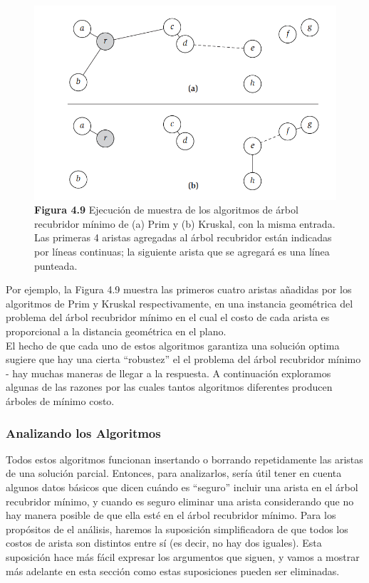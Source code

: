 \documentclass[a4paper, 12pt]{book}
\theoremstyle{dotless}
\begin{document}
\begin{figure}[h]
\centering
\includegraphics[scale=0.7]{Imagenes-Seccion4/fig_4_9.PNG}
\textbf{Figura 4.9} Ejecución de muestra de los algoritmos de árbol recubridor mínimo de (a) Prim y (b) Kruskal, con la misma entrada. Las primeras 4 aristas agregadas al árbol recubridor están indicadas por líneas continuas; la siguiente arista que se agregará es una línea punteada.
\end{figure}


Por ejemplo, la Figura 4.9 muestra las primeros cuatro aristas añadidas por los algoritmos de Prim y Kruskal respectivamente, en una instancia geométrica del problema del árbol recubridor mínimo en el cual el costo de cada arista es proporcional a la distancia geométrica en el plano.\\

El hecho de que cada uno de estos algoritmos garantiza una solución optima sugiere que hay una cierta ``robustez'' el el problema del árbol recubridor mínimo - hay muchas maneras de llegar a la respuesta. A continuación exploramos algunas de las razones por las cuales tantos algoritmos diferentes producen árboles de mínimo costo.\\

\subsubsection*{Analizando los Algoritmos}
Todos estos algoritmos funcionan insertando o borrando repetidamente las aristas de una
solución parcial. Entonces, para analizarlos, sería útil tener en cuenta algunos
datos básicos que dicen cuándo es ``seguro'' incluir una arista en el árbol recubridor mínimo, y cuando es seguro eliminar una arista considerando que no hay manera posible de que ella esté en el árbol recubridor mínimo. Para los propósitos de
el análisis, haremos la suposición simplificadora de que todos los costos de arista son
distintos entre sí (es decir, no hay dos iguales). Esta suposición hace más fácil expresar los argumentos que siguen, y vamos a mostrar más adelante en esta sección como estas suposiciones pueden ser eliminadas.\\
\end{document}
